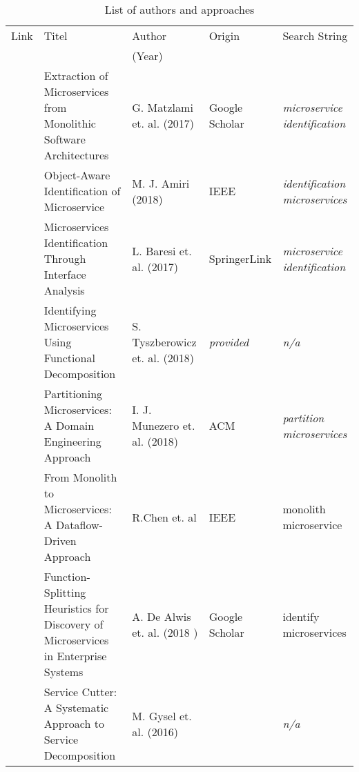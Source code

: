 \begin{table}[h!]

\centering
     
	
	\begin{tabularx}{\textwidth}{lXXlX}
		\rowcolor{gray!50}
		Link & Titel & Author   & Origin & Search String  \\
		
		\rowcolor{gray!50}
		& & (Year) & & \\
		
		\cite{ExtractionMazlami} & Extraction of Microservices from Monolithic Software Architectures  & G. Matzlami et. al. (2017) & Google Scholar&  {\itshape microservice identification }  \\
		
		
		\cite{ObjectAwareAmiri} & Object-Aware Identification of Microservice & M. J. Amiri (2018) & IEEE & \textit{identification microservices}\\\
		
		\cite{interfaceAnalysisBaresi} & Microservices Identification Through Interface Analysis & L. Baresi et. al. (2017)& SpringerLink & \textit{microservice identification}\\
		
		
		
		 
		 \cite{FunctionalDecompositionHeinrich}& Identifying Microservices Using Functional Decomposition & S. Tyszberowicz et. al. (2018) & \textit{provided} & \textit{n/a} \\
		 
		 \cite{DomainEngineeringMunezero} & Partitioning Microservices: A Domain Engineering Approach & I. J. Munezero et. al. (2018) & ACM & \textit{partition microservices}\\
		 
		 
		 \cite{DataflowDrivenChen} & From Monolith to Microservices: A Dataflow-Driven Approach & R.Chen et. al & IEEE & monolith microservice \\
		 
		\cite{HeuristicsAlwis} & Function-Splitting Heuristics for Discovery of Microservices in Enterprise Systems & A. De Alwis et. al. (2018 )& Google Scholar & identify microservices \\
		
	\cite{ServiceCutter} & 	Service Cutter: A Systematic Approach to Service Decomposition& M. Gysel et. al. (2016) & \cite{interfaceAnalysisBaresi} & \textit{n/a} \\
	
	\end{tabularx}
	\caption{List of authors and approaches}
	\label{tab:overviewLiterature}
\end{table}


